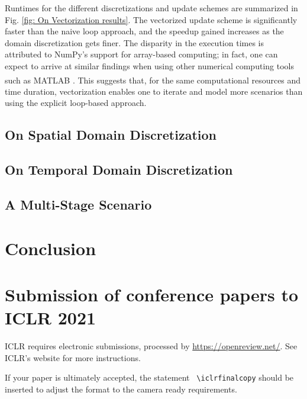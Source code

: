 \documentclass{article}
\begin{document}
Runtimes for the different discretizations and update schemes are summarized in Fig. \ref{fig: On Vectorization results}.
The vectorized update scheme is significantly faster than the naive loop approach,
and the speedup gained increases as the domain discretization gets finer.
The disparity in the execution times is attributed to NumPy's support for array-based computing;
in fact, one can expect to arrive at similar findings when using other numerical computing tools such as
MATLAB\textsuperscript{\textregistered} \citep{MATLABR2020b}.
This suggests that, for the same computational resources and time duration,
vectorization enables one to iterate and model more scenarios
than using the explicit loop-based approach.

\subsection{On Spatial Domain Discretization}
\label{subsec: On Spatial Domain Discretization}

\lipsum[54]

\subsection{On Temporal Domain Discretization}
\label{subsec: On Temporal Domain Discretization}

\lipsum[92]

\subsection{A Multi-Stage Scenario}
\label{subsec: A Multi-Stage Scenario}

\lipsum[84]

\section{Conclusion}
\label{sec: Conclusion}

\lipsum[20]

\section*{Submission of conference papers to ICLR 2021}

ICLR requires electronic submissions, processed by
\url{https://openreview.net/}. See ICLR's website for more instructions.

If your paper is ultimately accepted, the statement {\tt
  {\textbackslash}iclrfinalcopy} should be inserted to adjust the
format to the camera ready requirements.
\end{document}
